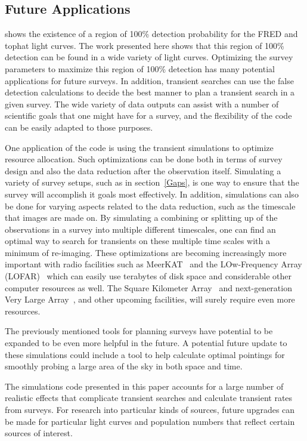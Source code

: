 \documentclass[12pt]{article}
\begin{document}
\subsection{Future Applications} \label{futureapplications}
\citet{2017MNRAS.465.4106C} shows the existence of a region of 100\% detection probability for the FRED and tophat light curves. The work presented here shows that this region of 100\% detection can be found in a wide variety of light curves. Optimizing the survey parameters to maximize this region of 100\% detection has many potential applications for future surveys. In addition, transient searches can use the false detection calculations to decide the best manner to plan a transient search in a given survey. The wide variety of data outputs can assist with a number of scientific goals that one might have for a survey, and the flexibility of the code can be easily adapted to those purposes.

One application of the code is using the transient simulations to optimize resource allocation. Such optimizations can be done both in terms of survey design and also the data reduction after the observation itself. Simulating a variety of survey setups, such as in section~\ref{Gaps}, is one way to ensure that the survey will accomplish it goals most effectively. In addition, simulations can also be done for varying aspects related to the data reduction, such as the timescale that images are made on. By simulating a combining or splitting up of the observations in a survey into multiple different timescales, one can find an optimal way to search for transients on these multiple time scales with a minimum of re-imaging. These optimizations are becoming increasingly more important with radio facilities such as MeerKAT~\citep{2016mks..confE...1J} and the LOw-Frequency Array (LOFAR)~\citep{2013A&A...556A...2V} which can easily use terabytes of disk space and considerable other computer resources as well. The Square Kilometer Array~\citep{2009IEEEP..97.1482D} and next-generation Very Large Array~\citep{2018ASPC..517....3M}, and other upcoming facilities, will surely require even more resources.

The previously mentioned tools for planning surveys have potential to be expanded to be even more helpful in the future. A potential future update to these simulations could include a tool to help calculate optimal pointings for smoothly probing a large area of the sky in both space and time. 

The simulations code presented in this paper accounts for a large number of realistic effects that complicate transient searches and calculate transient rates from surveys. For research into particular kinds of sources, future upgrades can be made for particular light curves and population numbers that reflect certain sources of interest. 
\end{document}
